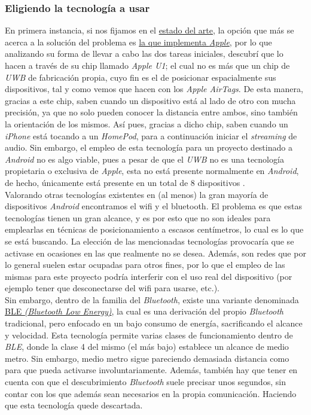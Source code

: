 \subsubsection{Eligiendo la tecnología a usar}

En primera instancia, si nos fijamos en el \hyperref[estado_del_arte]{estado del arte}, la opción que más se
acerca a la solución del problema es \hyperref[solucion_apple]{la que implementa \emph{Apple}}, por lo que
analizando su forma de llevar a cabo las dos tareas iniciales, descubrí que lo
hacen a través de su chip llamado \emph{Apple U1}; el cual no es más que un chip
de \emph{UWB} \cite{uwb-explicado} de fabricación propia, cuyo fin es el de
posicionar espacialmente sus dispositivos, tal y como vemos que hacen con los
\emph{Apple AirTags}. De esta manera, gracias a este chip, saben cuando un
dispositivo está al lado de otro con mucha precisión, ya que no solo pueden
conocer la distancia entre ambos, sino también la orientación de los mismos. Así
pues, gracias a dicho chip, saben cuando un \emph{iPhone} está tocando a un
\emph{HomePod}, para a continuación iniciar el \emph{streaming} de audio. Sin
embargo, el empleo de esta tecnología para un proyecto destinado a
\emph{Android} no es algo viable, pues a pesar de que el \emph{UWB} no es una
tecnología propietaria o exclusiva de \emph{Apple}, esta no está presente
normalmente en \emph{Android}, de hecho, únicamente está presente en un total de 8
dispositivos \cite{uwb-android}. \\

Valorando otras tecnologías existentes en (al menos) la gran mayoría de
dispositivos \emph{Android} encontramos el wifi y el bluetooth. El problema es
que estas tecnologías tienen un gran alcance, y es por esto que no son ideales
para emplearlas en técnicas de posicionamiento a escasos centímetros, lo cual es
lo que se está buscando. La elección de las mencionadas tecnologías provocaría que se
activase en ocasiones en las que realmente no se desea. Además, son redes que
por lo general suelen estar ocupadas para otros fines, por lo que el empleo de las
mismas para este proyecto podría interferir con el uso real del dispositivo (por
ejemplo tener que desconectarse del wifi para usarse, etc.).\\

Sin embargo, dentro de la familia del \emph{Bluetooth}, existe una variante
denominada \href{https://en.wikipedia.org/wiki/Bluetooth_Low_Energy}{BLE
\emph{(Bluetooth Low Energy)}}, la cual es una derivación del propio
\emph{Bluetooth} tradicional, pero enfocado en un bajo consumo de energía,
sacrificando el alcance y velocidad. Esta tecnología permite varias clases de
funcionamiento dentro de \emph{BLE}, donde la clase 4 del mismo (el más bajo)
establece un alcance de medio metro. Sin embargo, medio metro sigue
pareciendo demasiada distancia como para que pueda activarse involuntariamente.
Además, también hay que tener en cuenta con que el descubrimiento \emph{Bluetooth} suele
precisar unos segundos, sin contar con los que además sean necesarios en la
propia comunicación. Haciendo que esta tecnología quede descartada.\\

